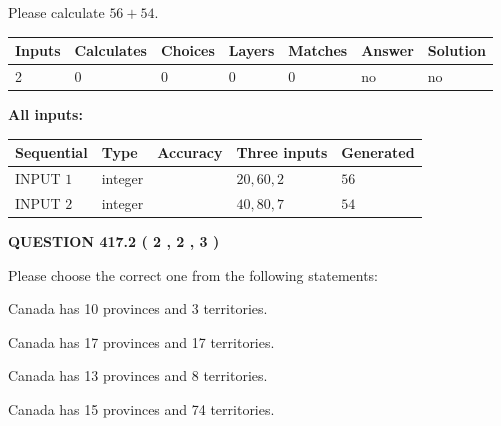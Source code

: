 \documentclass[12pt]{article}
\begin{document}
  
 
Please calculate $ %
56 +  %
54 $.
 
 
   
   
   
   
\noindent\begin{tabular}{|l|l|l|l|l|l|l|}
 \hline
Inputs & Calculates & Choices & Layers & Matches & Answer & Solution \\ \hline
 2  & 
 0  & 
 0
  & 
 0  & 
 0  & 
  no & 
  no 
  \\ \hline
 \end{tabular}
   
   
   
   
\noindent{}
   
   
   
   
\noindent\vspace{0.1in}\hspace{-0.08in} {\textbf{\Large{All inputs: }}}
   
   
  
  
\noindent\begin{tabular}{|l|l|l|l|l|}
\hline
 Sequential & Type & Accuracy & Three inputs & Generated \\ 
\hline
 
 
  INPUT $  1 $ & integer &  & $
 20
 , 
 60
 , 
 2
 $ & $ 56 $ 
 \\  \hline  
 
 
  INPUT $  2 $ & integer &  & $
 40
 , 
 80
 , 
 7
 $ & $ 54 $ 
 \\  \hline  
 \end{tabular}
   
   
  
\vspace{0.2in}
  
{\textbf{\Large{QUESTION
417.2 
 ( 2 , 2 , 3 )
}}}
  
  
Please choose the correct one from the following statements:
 
 
Canada has 10  provinces and 3 territories.
 
 
Canada has  17 provinces and  17 territories.
 
 
Canada has  13 provinces and  8 territories.
 
 
Canada has  15 provinces and  74 territories.
 
\end{document}
